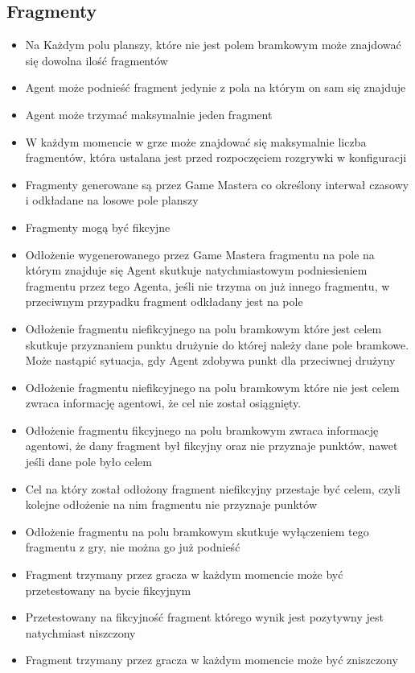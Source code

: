 \documentclass[Dokumentacja.tex]{subfiles}
\begin{document}
\subsection{Fragmenty}
\begin{itemize}
    \item Na Każdym polu planszy, które nie jest polem bramkowym może znajdować się dowolna ilość fragmentów
	\item Agent może podnieść fragment jedynie z pola na którym on sam się znajduje
    \item Agent może trzymać maksymalnie jeden fragment
    \item W każdym momencie w grze może znajdować się maksymalnie liczba fragmentów, która ustalana jest przed rozpoczęciem rozgrywki w konfiguracji
    \item Fragmenty generowane są przez Game Mastera co określony interwał czasowy i odkładane na losowe pole planszy
	\item Fragmenty mogą być fikcyjne
    \item Odłożenie wygenerowanego przez Game Mastera fragmentu na pole na którym znajduje się Agent skutkuje natychmiastowym podniesieniem fragmentu przez tego Agenta, jeśli nie trzyma on już innego fragmentu, w przeciwnym przypadku fragment odkładany jest na pole
    \item Odłożenie fragmentu niefikcyjnego na polu bramkowym które jest celem skutkuje przyznaniem punktu drużynie do której należy dane pole bramkowe. Może nastąpić sytuacja, gdy Agent zdobywa punkt dla przeciwnej drużyny
    \item Odłożenie fragmentu niefikcyjnego na polu bramkowym które nie jest celem zwraca informację agentowi, że cel nie został osiągnięty.
	\item Odłożenie fragmentu fikcyjnego na polu bramkowym zwraca informację agentowi, że dany fragment był fikcyjny oraz nie przyznaje punktów, nawet jeśli dane pole było celem
    \item Cel na który został odłożony fragment niefikcyjny przestaje być celem, czyli kolejne odłożenie na nim fragmentu nie przyznaje punktów
    \item Odłożenie fragmentu na polu bramkowym skutkuje wyłączeniem tego fragmentu z gry, nie można go już podnieść
    \item Fragment trzymany przez gracza w każdym momencie może być przetestowany na bycie fikcyjnym
    \item Przetestowany na fikcyjność fragment którego wynik jest pozytywny jest natychmiast niszczony
    \item Fragment trzymany przez gracza w każdym momencie może być zniszczony
\end{itemize}
\end{document}
